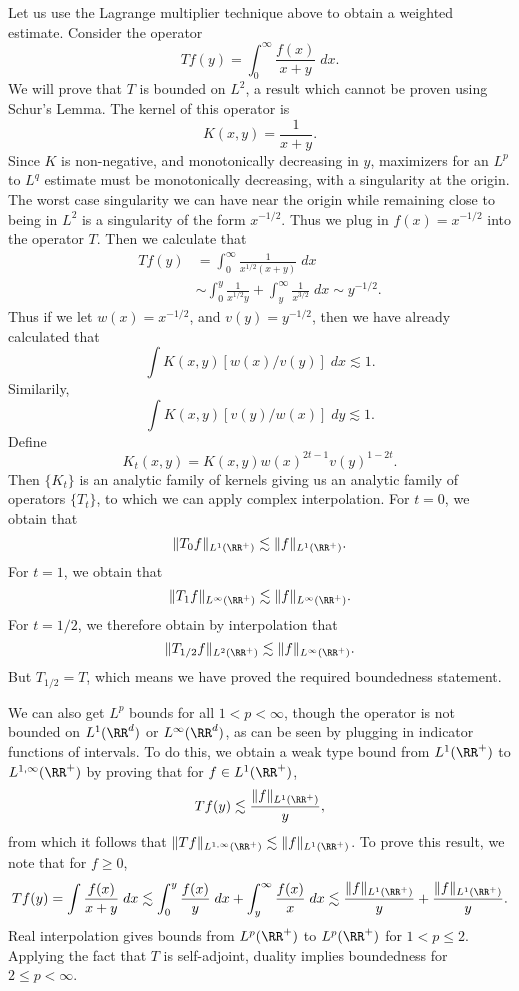 \begin{example}
    Let us use the Lagrange multiplier technique above to obtain a weighted estimate. Consider the operator
    \[ Tf(y) = \int_0^\infty \frac{f(x)}{x + y}\; dx. \]
    We will prove that $T$ is bounded on $L^2$, a result which cannot be proven using Schur's Lemma. The kernel of this operator is
    \[ K(x,y) = \frac{1}{x + y}. \]
    Since $K$ is non-negative, and monotonically decreasing in $y$, maximizers for an $L^p$ to $L^q$ estimate must be monotonically decreasing, with a singularity at the origin. The worst case singularity we can have near the origin while remaining close to being in $L^2$ is a singularity of the form $x^{-1/2}$. Thus we plug in $f(x) = x^{-1/2}$ into the operator $T$. Then we calculate that
    \begin{align*}
        Tf(y) &= \int_0^\infty \frac{1}{x^{1/2} (x + y)}\; dx\\
        &\sim \int_0^y \frac{1}{x^{1/2} y} + \int_y^\infty \frac{1}{x^{3/2}}\; dx \sim y^{-1/2}.
    \end{align*}
    Thus if we let $w(x) = x^{-1/2}$, and $v(y) = y^{-1/2}$, then we have already calculated that
    \[ \int K(x,y) [w(x) / v(y)]\; dx \lesssim 1. \]
    Similarily,
    \[ \int K(x,y) [v(y) / w(x)]\; dy \lesssim 1. \]
    Define
    \[ K_t(x,y) = K(x,y) w(x)^{2t - 1} v(y)^{1-2t}. \]
    Then $\{ K_t \}$ is an analytic family of kernels giving us an analytic family of operators $\{ T_t \}$, to which we can apply complex interpolation. For $t = 0$, we obtain that
    \[ \| T_0 f \|_{L^1(\RR^+)} \lesssim \| f \|_{L^1(\RR^+)}. \]
    For $t = 1$, we obtain that
    \[ \| T_1 f \|_{L^\infty(\RR^+)} \lesssim \| f \|_{L^\infty(\RR^+)}. \]
    For $t = 1/2$, we therefore obtain by interpolation that
    \[ \| T_{1/2} f \|_{L^2(\RR^+)} \lesssim \| f \|_{L^\infty(\RR^+)}. \]
    But $T_{1/2} = T$, which means we have proved the required boundedness statement.

    We can also get $L^p$ bounds for all $1 < p < \infty$, though the operator is not bounded on $L^1(\RR^d)$ or $L^\infty(\RR^d)$, as can be seen by plugging in indicator functions of intervals. To do this, we obtain a weak type bound from $L^1(\RR^+)$ to $L^{1,\infty}(\RR^+)$ by proving that for $f \in L^1(\RR^+)$,
    \[ Tf(y) \lesssim \frac{\| f \|_{L^1(\RR^+)}}{y}, \]
    from which it follows that $\| Tf \|_{L^{1,\infty}(\RR^+)} \lesssim \| f \|_{L^1(\RR^+)}$. To prove this result, we note that for $f \geq 0$,
    \[ Tf(y) = \int \frac{f(x)}{x + y}\; dx \lesssim \int_0^y \frac{f(x)}{y}\; dx + \int_y^\infty \frac{f(x)}{x}\; dx \lesssim \frac{\| f \|_{L^1(\RR^+)}}{y} + \frac{\| f \|_{L^1(\RR^+)}}{y}. \]
    Real interpolation gives bounds from $L^p(\RR^+)$ to $L^p(\RR^+)$ for $1 < p \leq 2$. Applying the fact that $T$ is self-adjoint, duality implies boundedness for $2 \leq p < \infty$.
\end{example}

